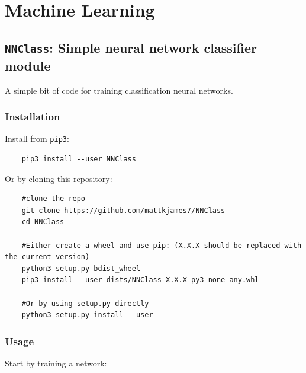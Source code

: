 \chapter{Machine Learning}

	\section{\texttt{NNClass}: Simple neural network classifier module}

	A simple bit of code for training classification neural networks.
	
	\subsection{Installation}
	
	Install from \texttt{pip3}:
	
	\begin{verbatim}
	pip3 install --user NNClass
	\end{verbatim}
	
	Or by cloning this repository:
	
	\begin{verbatim}
	#clone the repo
	git clone https://github.com/mattkjames7/NNClass
	cd NNClass
	
	#Either create a wheel and use pip: (X.X.X should be replaced with the current version)
	python3 setup.py bdist_wheel
	pip3 install --user dists/NNClass-X.X.X-py3-none-any.whl
	
	#Or by using setup.py directly
	python3 setup.py install --user
	\end{verbatim}
	
	
	\subsection{Usage}
	
	Start by training a network:
	
